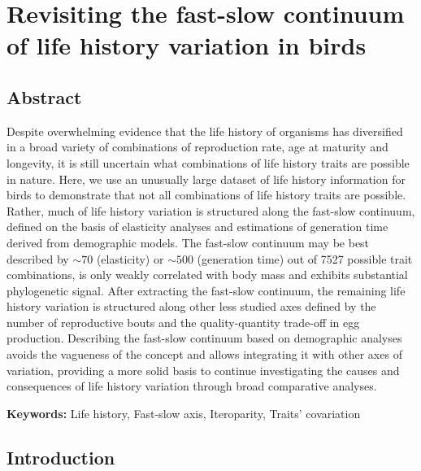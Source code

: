 \chapter[Axes of life history variation]{Revisiting the fast-slow continuum of 
life history variation in birds
}\label{ch:LHaxes}


\section*{Abstract}

Despite overwhelming evidence that the life history of organisms has diversified
in a broad variety of combinations of reproduction rate, age at maturity and
longevity, it is still uncertain what combinations of life history traits are
possible in nature. Here, we use an unusually large dataset of life history
information for birds to demonstrate that not all combinations of life history
traits are possible. Rather, much of life history variation is structured along
the fast-slow continuum, defined on the basis of elasticity analyses and
estimations of generation time derived from demographic models. The fast-slow
continuum may be best described by $\sim70$ (elasticity) or $\sim500$
(generation time) out of 7527 possible trait combinations, is only weakly
correlated with body mass and exhibits substantial phylogenetic signal. After
extracting the fast-slow continuum, the remaining life history variation is
structured along other less studied axes defined by the number of
reproductive bouts and the quality-quantity trade-off in egg production.
Describing the fast-slow continuum based on demographic analyses avoids the
vagueness of the concept and allows integrating it with other axes of variation,
providing a more solid basis to continue investigating the causes and
consequences of life history variation through broad comparative analyses.

\bigskip
\textbf{Keywords:} Life history, Fast-slow axis, Iteroparity, Traits' covariation

\clearpage


\section{Introduction}

